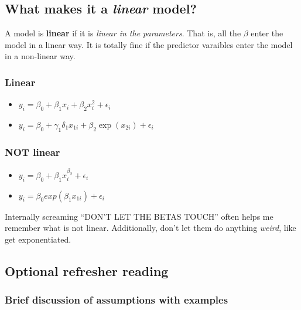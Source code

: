 \documentclass[
  openany]{book}
\providecommand{\tightlist}{%
  \setlength{\itemsep}{0pt}\setlength{\parskip}{0pt}}
\begin{document}
\hypertarget{what-makes-it-a-linear-model}{%
\subsection{\texorpdfstring{What makes it a \emph{linear} model?}{What makes it a linear model?}}\label{what-makes-it-a-linear-model}}

A model is \textbf{linear} if it is \emph{linear in the parameters}. That is, all the \(\beta\) enter the model in a linear way. It is totally fine if the predictor varaibles enter the model in a non-linear way.

\hypertarget{linear}{%
\subsubsection{Linear}\label{linear}}

\begin{itemize}
\tightlist
\item
  \(y_i = \beta_0 + \beta_1x_i + \beta_2x_i^2 + \epsilon_i\)\\
\item
  \(y_i = \beta_0 + γ_1δ_1x_{1i} + \beta_2\exp(x_{2i}) + \epsilon_i\)
\end{itemize}

\hypertarget{not-linear}{%
\subsubsection{NOT linear}\label{not-linear}}

\begin{itemize}
\tightlist
\item
  \(y_i = \beta_0 + \beta_1x_i^{\beta_2} + \epsilon_i\)\\
\item
  \(y_i = \beta_0 exp(\beta_1x_{1i}) + \epsilon_i\)
\end{itemize}

Internally screaming ``DON'T LET THE BETAS TOUCH'' often helps me remember what is not linear. Additionally, don't let them do anything \emph{weird}, like get exponentiated.

\hypertarget{optional-refresher-reading}{%
\subsection{Optional refresher reading}\label{optional-refresher-reading}}

\hypertarget{brief-discussion-of-assumptions-with-examples}{%
\subsubsection{Brief discussion of assumptions with examples}\label{brief-discussion-of-assumptions-with-examples}}
\end{document}
